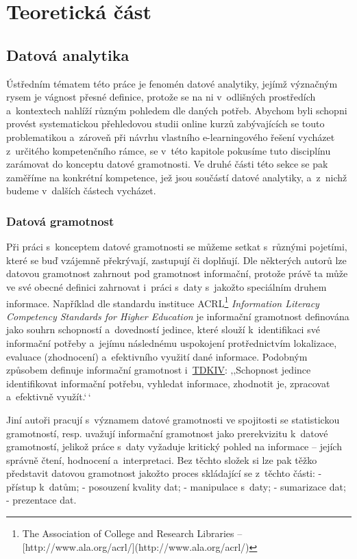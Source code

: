 \part{Teoretická část}

\hypertarget{datovuxe1-analytika}{%
\chapter{Datová analytika}\label{datovuxe1-analytika}}

Ústředním tématem této práce je fenomén datové analytiky, jejímž
význačným rysem je vágnost přesné definice, protože se na ni v~odlišných
prostředích a~kontextech nahlíží různým pohledem dle daných potřeb.
Abychom byli schopni provést systematickou přehledovou studii online
kurzů zabývajících se touto problematikou a~zároveň při návrhu vlastního
e-learningového řešení vycházet z~určitého kompetenčního rámce, se
v~této kapitole pokusíme tuto disciplínu zarámovat do konceptu datové
gramotnosti. Ve druhé části této sekce se pak zaměříme na konkrétní
kompetence, jež jsou součástí datové analytiky, a~z~nichž budeme
v~dalších částech vycházet.

\hypertarget{datovuxe1-gramotnost}{%
\section{Datová gramotnost}\label{datovuxe1-gramotnost}}

Při práci s~konceptem datové gramotnosti se můžeme setkat s~různými
pojetími, které se buď vzájemně překrývají, zastupují či doplňují. Dle
některých autorů lze datovou gramotnost zahrnout pod gramotnost
informační, protože právě ta může ve své obecné definici zahrnovat
i~práci s~daty s~jakožto speciálním druhem informace.
\parencite[126]{calzada13} Například dle standardu instituce
ACRL\footnote{The Association of College and Research Libraries – [http://www.ala.org/acrl/](http://www.ala.org/acrl/)}
\emph{Information Literacy Competency Standards for Higher Education} je
informační gramotnost definována jako souhrn schopností a~dovedností
jedince, které slouží k~identifikaci své informační potřeby a~jejímu
následnému uspokojení protřednictvím lokalizace, evaluace (zhodnocení)
a~efektivního využití dané informace. \parencite[2]{acrl06} Podobným
způsobem definuje informační gramotnost
i~\href{https://tdkiv.nkp.cz/}{TDKIV}: ‚‚Schopnost jedince identifikovat
informační potřebu, vyhledat informace, zhodnotit je, zpracovat
a~efektivně využít.`\,` \parencite{tdkiv03}

Jiní autoři pracují s~významem datové gramotnosti ve spojitosti se
statistickou gramotností, resp. uvažují informační gramotnost jako
prerekvizitu k~datové gramotností, jelikož práce s~daty vyžaduje
kritický pohled na informace -- jejích správně čtení, hodnocení
a~interpretaci. Bez těchto složek si lze pak těžko představit datovou
gramotnost jakožto proces skládající se z~těchto části:
\parencite[8]{schield05} - přístup k~datům; - posouzení kvality dat; -
manipulace s~daty; - sumarizace dat; - prezentace dat.
